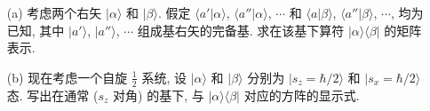 \documentclass{assignment}
\begin{document}
\begin{prob}
    \begin{itemize}
        \item[(a)] 考虑两个右矢 $\lvert\alpha\rangle$ 和 $\lvert\beta\rangle$. 假定 $\langle a'\vert\alpha\rangle$, $\langle a''\vert\alpha\rangle$, $\cdots$ 和 $\langle a\vert\beta\rangle$, $\langle a''\vert\beta\rangle$, $\cdots$, 均为已知, 其中 $\lvert a'\rangle$, $\lvert a''\rangle$, $\cdots$ 组成基右矢的完备基. 求在该基下算符 $\lvert\alpha\rangle\langle\beta\rvert$ 的矩阵表示.
        \item[(b)] 现在考虑一个自旋 $\frac{1}{2}$ 系统, 设 $\lvert\alpha\rangle$ 和 $\lvert\beta\rangle$ 分别为 $\lvert s_z=\hbar/2\rangle$ 和 $\lvert s_x=\hbar/2\rangle$ 态. 写出在通常 ($s_z$ 对角) 的基下, 与 $\lvert\alpha\rangle\langle\beta\rvert$ 对应的方阵的显示式.
    \end{itemize}
\end{prob}
\end{document}

